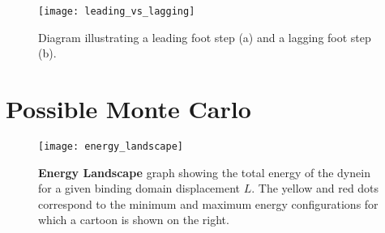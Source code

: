	
\begin{figure}[!hbt]
	\centering
	\texttt{[image: leading\_vs\_lagging]}
	\caption{Diagram illustrating a leading foot step (a) and a lagging foot step (b).}
\end{figure}



\section{Possible Monte Carlo}
\begin{figure}[!hbt]
	\centering
	\texttt{[image: energy\_landscape]}
	\caption{\textbf{Energy Landscape} graph showing the total energy of the dynein for a given binding domain displacement $L$. The yellow and red dots correspond to the minimum and maximum energy configurations for which a cartoon is shown on the right.}
	\label{fig:energy_landscape}
\end{figure}


			

\vspace{10em}
